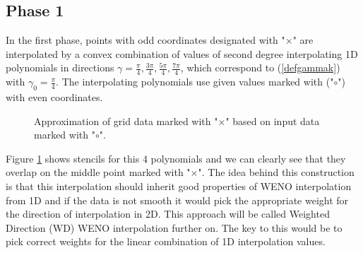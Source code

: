 	\subsection{Phase 1}
	In the first phase, points with odd coordinates designated with "$\times$" are interpolated by a convex combination of values of second degree interpolating 1D polynomials in directions $\gamma=\frac{\pi}{4}, \frac{3\pi}{4}, \frac{5\pi}{4}, \frac{7\pi}{4}$, which correspond to (\ref{defgammak}) with $\gamma_0=\frac{\pi}{4}$. 
	The interpolating polynomials use given values marked with ("$\circ$") with even coordinates. 
	




\begin{figure}
	\begin{center}
		 \quad 
		\caption{Approximation of grid data marked with "$\times$" based on input data marked with "$\circ$".}
		\label{fig:x}
	\end{center}
\end{figure}	
	
	Figure \ref{fig:x} shows stencils for this 4 polynomials and we can clearly see that they overlap on the middle point marked with "$\times$".
	The idea behind this construction is that this interpolation should inherit good properties of WENO interpolation from 1D and if the data is not smooth it would pick the appropriate weight for the direction of interpolation in 2D. {This approach will be called Weighted Direction (WD) WENO interpolation further on.} 
	The key to this would be to pick correct weights for the linear combination of 1D interpolation values.
	

